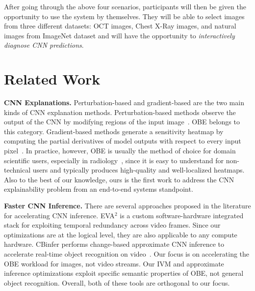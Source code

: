 \documentclass{vldb}
\begin{document}
\vspace{2mm}
After going through the above four scenarios, participants will then be given the opportunity to use the system by themselves.
They will be able to select images from three different datasets: OCT images, Chest X-Ray images, and natural images from ImageNet dataset and will have the opportunity to \textit{interactively diagnose CNN predictions}.

\section{Related Work}

\noindent \textbf{CNN Explanations.} Perturbation-based and gradient-based are the two main kinds of CNN explanation methods. Perturbation-based methods observe the output of the CNN by modifying regions of the input image~\cite{zeiler2014visualizing}. OBE belongs to this category.
Gradient-based methods generate a sensitivity heatmap by computing the partial derivatives of model outputs with respect to every input pixel~\cite{simonyan2013deep}.
In practice, however, OBE is usually the method of choice for domain scientific users, especially in radiology~\cite{jung2017deep,miller2017explanation}, since it is easy to understand for non-technical users and typically produces high-quality and well-localized heatmaps.
Also to the best of our knowledge, ours is the first work to address the CNN explainability problem from an end-to-end systems standpoint.

\vspace{2mm}
\noindent \textbf{Faster CNN Inference.} There are several approaches proposed in the literature for accelerating CNN inference.
EVA$^2$ \cite{buckler2018eva} is a custom software-hardware integrated stack for exploiting temporal redundancy across video frames. Since our optimizations are at the logical level, they are also applicable to any compute hardware.
CBinfer performs change-based approximate CNN inference to accelerate real-time object recognition on video~\cite{cavigelli2017cbinfer}. Our focus is on accelerating the OBE workload for images, not video streams. Our IVM and approximate inference optimizations exploit specific semantic properties of OBE, not general object recognition. Overall, both of these tools are orthogonal to our focus.


\balance



\end{document}
